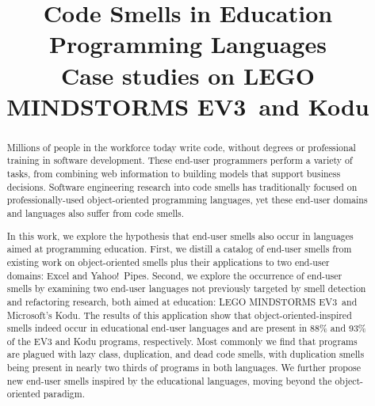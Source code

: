 \documentclass[conference]{IEEEtran}
\newcommand{\ms}{LEGO MINDSTORMS EV3}
\begin{document}
\title{Code Smells in Education Programming Languages \large{\\Case studies on \ms~and Kodu}}


\author{
\and
{}
\and
{}
}



\maketitle

\begin{abstract}
Millions of people in the workforce today write code, without degrees or professional training in software development. These end-user programmers perform a variety of tasks, from combining web information to building models that support business decisions. Software engineering research into code smells has traditionally focused on professionally-used object-oriented programming languages, yet these end-user domains and languages also suffer from code smells. 

In this work, we explore the hypothesis that end-user smells also occur in languages aimed at programming education. First, we distill a catalog of end-user smells from existing work on object-oriented smells plus their applications to two end-user domains: Excel and Yahoo!\ Pipes.
Second, we explore the occurrence of end-user smells by examining two end-user languages not previously targeted by smell detection and refactoring research, both aimed at education: \ms~and Microsoft's Kodu. The results of this application show that object-oriented-inspired smells indeed occur in educational end-user languages and are present in 88\% and 93\% of the EV3 and Kodu programs, respectively. Most commonly we find that programs are plagued with lazy class, duplication, and dead code smells, with duplication smells being present in nearly two thirds of programs in both languages. We further propose new end-user smells inspired by the educational languages, moving beyond the object-oriented paradigm. 
\end{abstract}
\end{document}
